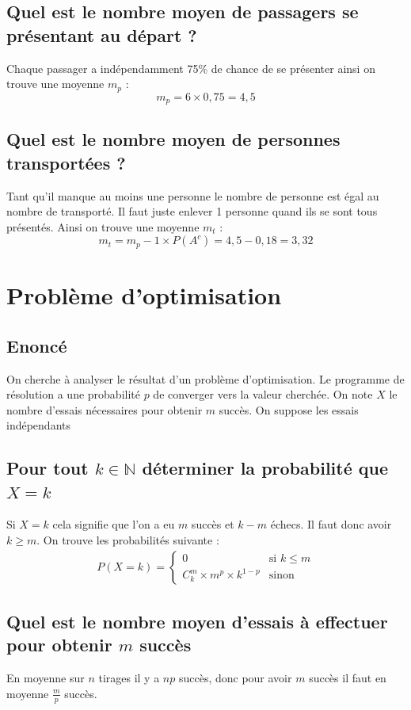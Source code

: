 \documentclass[10pt,a4paper,twoside]{article}
\begin{document}
\subsection{Quel est le nombre moyen de passagers se présentant au départ ?}
Chaque passager a indépendamment 75\% de chance de se présenter ainsi on trouve une moyenne $m_{p}$ :
\[ m_{p}=6\times 0,75 = 4,5\]

\subsection{Quel est le nombre moyen de personnes transportées ?}
Tant qu'il manque au moins une personne le nombre de personne est égal au nombre de transporté. Il faut juste enlever 1 personne quand ils se sont tous présentés. Ainsi on trouve une moyenne $m_{t}$ :
\[ m_{t}=m_{p}-1\times P(A^{c}) = 4,5 - 0,18 = 3,32 \]

\section{Problème d'optimisation}
\subsection*{Enoncé}
On cherche à analyser le résultat d'un problème d'optimisation. Le programme de résolution a une probabilité $p$ de converger vers la valeur cherchée. On note $X$ le nombre d'essais nécessaires pour obtenir $m$ succès. On suppose les essais indépendants

\subsection{Pour tout $k\in\mathbb{N}$ déterminer la probabilité que $X=k$}
Si $X=k$ cela signifie que l'on a eu $m$ succès et $k-m$ échecs. Il faut donc avoir $k\geqslant m$. On trouve les probabilités suivante :
\begin{align*}
P(X=k)=\left\lbrace
\begin{array}{ll}
0 & \text{si } k\leq m\\
C^{m}_{k} \times m^{p} \times k^{1-p} & \text{sinon}
\end{array}\right.
\end{align*}

\subsection{Quel est le nombre moyen d'essais à effectuer pour obtenir $m$ succès}
En moyenne sur $n$ tirages il y a $np$ succès, donc pour avoir $m$ succès il faut en moyenne $\frac{m}{p}$ succès.
\end{document}
